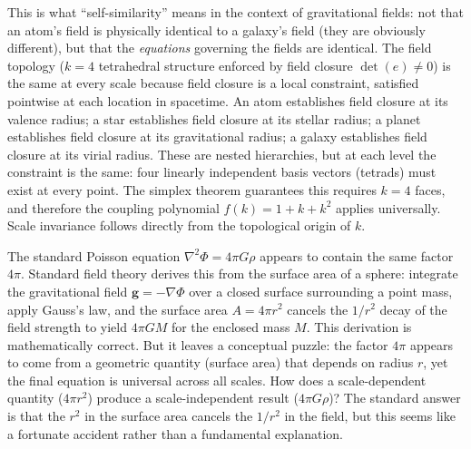 \documentclass[aps,prd,preprint,superscriptaddress,showpacs,preprintnumbers,amsmath,amssymb,nofootinbib]{revtex4-2}
\begin{document}

This is what ``self-similarity'' means in the context of gravitational fields: not that an atom's field is physically identical to a galaxy's field (they are obviously different), but that the \emph{equations} governing the fields are identical. The field topology ($k=4$ tetrahedral structure enforced by field closure $\det(e) \neq 0$) is the same at every scale because field closure is a local constraint, satisfied pointwise at each location in spacetime. An atom establishes field closure at its valence radius; a star establishes field closure at its stellar radius; a planet establishes field closure at its gravitational radius; a galaxy establishes field closure at its virial radius. These are nested hierarchies, but at each level the constraint is the same: four linearly independent basis vectors (tetrads) must exist at every point. The simplex theorem guarantees this requires $k=4$ faces, and therefore the coupling polynomial $f(k) = 1 + k + k^2$ applies universally. Scale invariance follows directly from the topological origin of $k$.

The standard Poisson equation $\nabla^2\Phi = 4\pi G\rho$ appears to contain the same factor $4\pi$. Standard field theory derives this from the surface area of a sphere: integrate the gravitational field $\mathbf{g} = -\nabla\Phi$ over a closed surface surrounding a point mass, apply Gauss's law, and the surface area $A = 4\pi r^2$ cancels the $1/r^2$ decay of the field strength to yield $4\pi G M$ for the enclosed mass $M$. This derivation is mathematically correct. But it leaves a conceptual puzzle: the factor $4\pi$ appears to come from a geometric quantity (surface area) that depends on radius $r$, yet the final equation is universal across all scales. How does a scale-dependent quantity ($4\pi r^2$) produce a scale-independent result ($4\pi G\rho$)? The standard answer is that the $r^2$ in the surface area cancels the $1/r^2$ in the field, but this seems like a fortunate accident rather than a fundamental explanation.
\end{document}
